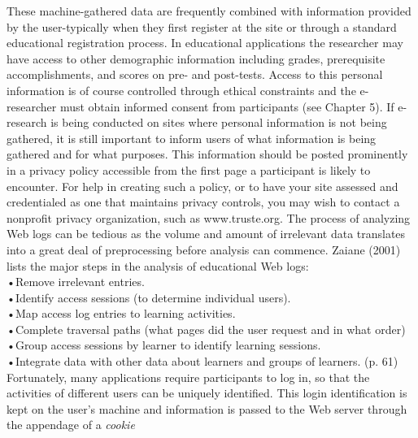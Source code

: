 \documentclass{book}
\begin{document}
These machine-gathered data are frequently combined with information provided by the user-typically when they first register at the site or through a standard educational registration process. In educational applications the researcher may have access to other demographic information including grades, prerequisite accomplishments, and scores on pre- and post-tests. Access to this personal information is of course controlled through ethical constraints and the e-researcher must obtain informed consent from participants (see Chapter 5). If e-research is being conducted on sites where personal information is not being gathered, it is still important to inform users of what information is being gathered and for what purposes. This information should be posted prominently in a privacy policy accessible from the first page a participant is likely to encounter. For help in creating such a policy, or to have your site assessed and credentialed as one that maintains privacy controls, you may wish to contact a nonprofit privacy organization, such as www.truste.org.
The process of analyzing Web logs can be tedious as the volume and amount of irrelevant data translates into a great deal of preprocessing before analysis can commence. Zaiane (2001) lists the major steps in the analysis of educational Web logs:
\\\hspace*{0.5cm}•Remove irrelevant entries.
\\\hspace*{0.5cm}•Identify access sessions (to determine individual users).
\\\hspace*{0.5cm}•Map access log entries to learning activities.
\\\hspace*{0.5cm}•Complete traversal paths (what pages did the user request and in what order)
\\\hspace*{0.5cm}•Group access sessions by learner to identify learning sessions.
\\\hspace*{0.5cm}•Integrate data with other data about learners and groups of learners. (p. 61)\\


Fortunately, many applications require participants to log in, so that the activities of different users can be uniquely identified. This login identification is kept on the user's machine and information is passed to the Web server through the appendage of a \emph{cookie}
\end{document}
